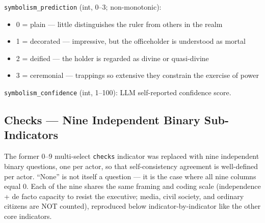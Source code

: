 \documentclass[11pt, a4paper]{article}
\begin{document}

\texttt{symbolism\_prediction} (int, 0--3; non-monotonic):
\begin{itemize}[nosep, leftmargin=1.7em]
  \item 0 = plain --- little distinguishes the ruler from others in the realm
  \item 1 = decorated --- impressive, but the officeholder is understood as mortal
  \item 2 = deified --- the holder is regarded as divine or quasi-divine
  \item 3 = ceremonial --- trappings so extensive they constrain the exercise of power
\end{itemize}
\texttt{symbolism\_confidence} (int, 1--100): LLM self-reported confidence score.

\subsection{Checks --- Nine Independent Binary Sub-Indicators}

The former 0--9 multi-select \texttt{checks} indicator was replaced with nine independent
binary questions, one per actor, so that self-consistency agreement is well-defined per actor.
``None'' is not itself a question --- it is the case where all nine columns equal 0. Each of the
nine shares the same framing and coding scale (independence + de facto capacity to resist the
executive; media, civil society, and ordinary citizens are NOT counted), reproduced below
indicator-by-indicator like the other core indicators.
\end{document}
